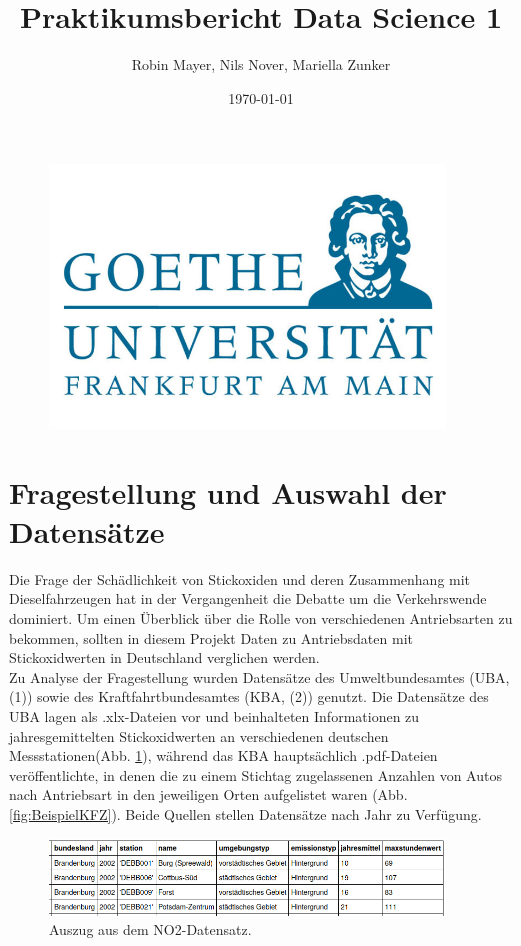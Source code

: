 \documentclass[11pt,a4paper,oneside,german]{article}
\title{Praktikumsbericht Data Science 1}
\author{Robin Mayer, Nils Nover, Mariella Zunker}
\date{\today}
\begin{document}
	\maketitle
	
	\begin{figure}[h]
		\centering
		\includegraphics[width=10.5cm]{uniemblem.jpg}		
	\end{figure}
	
	\newpage
	
	\tableofcontents
	
	\section{Fragestellung und Auswahl der Datensätze}
	
	Die Frage der Schädlichkeit von Stickoxiden und deren Zusammenhang mit Dieselfahrzeugen hat in der Vergangenheit die Debatte um die Verkehrswende dominiert. Um einen Überblick über die Rolle von verschiedenen Antriebsarten zu bekommen, sollten in diesem Projekt Daten zu Antriebsdaten mit Stickoxidwerten in Deutschland verglichen werden. \\
	Zu Analyse der Fragestellung wurden Datensätze des Umweltbundesamtes (UBA, (1)) sowie des Kraftfahrtbundesamtes (KBA, (2)) genutzt. Die Datensätze des UBA lagen als .xlx-Dateien vor und beinhalteten Informationen zu jahresgemittelten Stickoxidwerten an verschiedenen deutschen Messstationen(Abb. \ref{fig:BeispielNO2}), während das KBA hauptsächlich .pdf-Dateien veröffentlichte, in denen die zu einem Stichtag zugelassenen Anzahlen von Autos nach Antriebsart in den jeweiligen Orten aufgelistet waren (Abb. \ref{fig:BeispielKFZ}). Beide Quellen stellen Datensätze nach Jahr zu Verfügung.
	
	\begin{figure}[h!]
		\centering
		\includegraphics[width=10.5cm]{BeispielNO2.png}
		\caption{Auszug aus dem NO2-Datensatz.}
		\label{fig:BeispielNO2}
	\end{figure}
	
\end{document}
